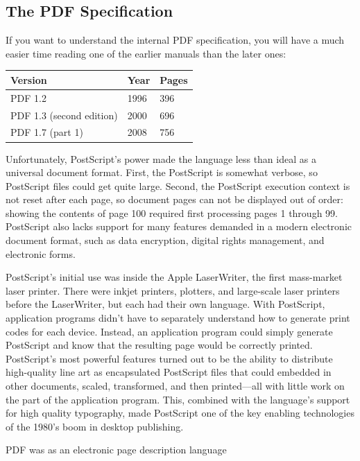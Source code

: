 \subsection{The PDF Specification}

If you want to understand the internal PDF specification, you will have a much
easier time reading one of the earlier manuals than the later ones:

\begin{tabular}{lll}
Version & Year & Pages \\
\hline
PDF 1.2 & 1996 & 396 \\
PDF 1.3 (second edition) & 2000 & 696 \\
PDF 1.7 (part 1) & 2008 & 756\\
\end{tabular}




Unfortunately, PostScript's power made the language
less than ideal as a universal document format. First, the PostScript
is somewhat verbose, so PostScript files could get quite
large. Second, the PostScript execution context is not reset
after each page, so document pages can not be displayed out of
order: showing the contents of page 100 required first processing pages 1 through 99. PostScript also
lacks support for many features demanded in a modern electronic document format,
such as data encryption, digital rights management, and electronic forms.





PostScript's initial use was inside the Apple LaserWriter, the first
mass-market laser printer. There were inkjet printers, plotters, and
large-scale laser printers before the LaserWriter, but each 
had their own  language. With PostScript, application
programs didn't have to separately understand how to generate print
codes for each device. Instead, an
application program could simply generate PostScript and know that the
resulting page would be correctly printed. PostScript's most powerful features turned out to be
the ability to distribute high-quality line art as encapsulated
PostScript files that could embedded in other documents, scaled,
transformed, and then printed---all with little work on the part of
the application program. This, combined with the language's support
for high quality typography, made PostScript one of the key enabling
technologies of the 1980's boom in desktop publishing.


PDF was as an electronic page description language


